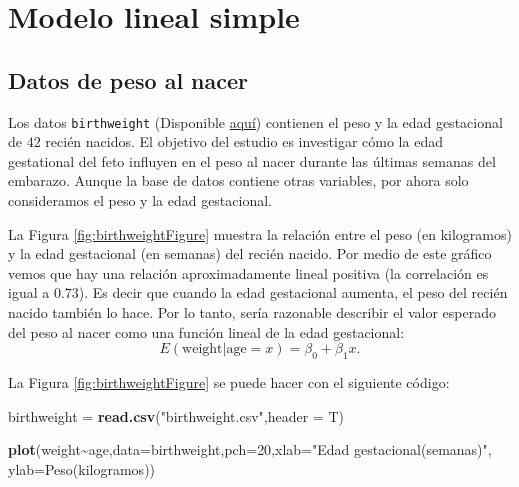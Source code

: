 \documentclass[
]{article}
\newenvironment{Shaded}{\begin{snugshade}}{\end{snugshade}}
\newcommand{\AttributeTok}[1]{\textcolor[rgb]{0.13,0.29,0.53}{#1}}
\newcommand{\DecValTok}[1]{\textcolor[rgb]{0.00,0.00,0.81}{#1}}
\newcommand{\FunctionTok}[1]{\textcolor[rgb]{0.13,0.29,0.53}{\textbf{#1}}}
\newcommand{\NormalTok}[1]{#1}
\newcommand{\OtherTok}[1]{\textcolor[rgb]{0.56,0.35,0.01}{#1}}
\newcommand{\SpecialCharTok}[1]{\textcolor[rgb]{0.81,0.36,0.00}{\textbf{#1}}}
\newcommand{\StringTok}[1]{\textcolor[rgb]{0.31,0.60,0.02}{#1}}
\begin{document}
\hypertarget{modelo-lineal-simple}{%
\section{Modelo lineal simple}\label{modelo-lineal-simple}}

\hypertarget{datos-de-peso-al-nacer}{%
\subsection*{Datos de peso al nacer}\label{datos-de-peso-al-nacer}}

Los datos \texttt{birthweight} (Disponible \href{https://raw.githubusercontent.com/AlvaroFlorez/MLG1/master/Birthweight.csv}{aquí}) contienen el peso y la edad gestacional de \(42\) recién nacidos. El objetivo del estudio es investigar cómo la edad gestational del feto influyen en el peso al nacer durante las últimas semanas del embarazo. Aunque la base de datos contiene otras variables, por ahora solo consideramos el peso y la edad gestacional.

La Figura \ref{fig:birthweightFigure} muestra la relación entre el peso (en kilogramos) y la edad gestacional (en semanas) del recién nacido. Por medio de este gráfico vemos que hay una relación aproximadamente lineal positiva (la correlación es igual a 0.73). Es decir que cuando la edad gestacional aumenta, el peso del recién nacido también lo hace. Por lo tanto, sería razonable describir el valor esperado del peso al nacer como una función lineal de la edad gestacional:
\[
E(\mbox{weight}|\mbox{age}=x) = \beta_{0} + \beta_{1}x.
\]

La Figura \ref{fig:birthweightFigure} se puede hacer con el siguiente código:

\begin{Shaded}
\begin{Highlighting}[]
\NormalTok{birthweight }\OtherTok{=} \FunctionTok{read.csv}\NormalTok{(}\StringTok{"birthweight.csv"}\NormalTok{,}\AttributeTok{header =}\NormalTok{ T)}

\FunctionTok{plot}\NormalTok{(weight}\SpecialCharTok{\textasciitilde{}}\NormalTok{age,}\AttributeTok{data=}\NormalTok{birthweight,}\AttributeTok{pch=}\DecValTok{20}\NormalTok{,}\AttributeTok{xlab=}\StringTok{"Edad gestacional(semanas)"}\NormalTok{,}
     \AttributeTok{ylab=}\StringTok{\textquotesingle{}Peso(kilogramos)\textquotesingle{}}\NormalTok{)}
\end{Highlighting}
\end{Shaded}
\end{document}
